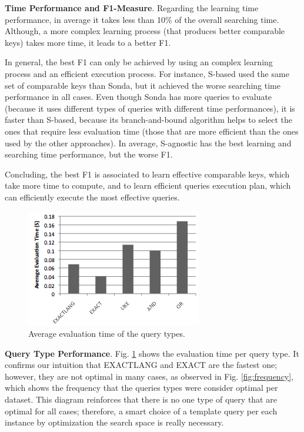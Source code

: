 \textbf{Time Performance and F1-Measure}. Regarding the learning time performance, in average it takes less than 10\% of the overall searching time. Although, a more complex learning process (that produces better comparable keys) takes more time, it leads to a better F1. 

In general, the best F1 can only be achieved by using an complex learning process and an efficient execution process. For instance, S-based used the same set of comparable keys than Sonda, but it achieved the worse searching time performance in all cases. Even though Sonda has more queries to evaluate (because it uses different types of queries with different time performances), it is faster than S-based, because its  branch-and-bound algorithm helps to select the ones that require less evaluation time (those that are more efficient than the ones used by the other approaches).  In average, S-agnostic has the best learning and searching time performance, but the worse F1. 

Concluding, the best F1 is associated to learn effective comparable keys, which take more time to compute, and to learn efficient queries execution plan, which can efficiently execute the most effective queries. 
  \begin{figure} [h]
\vspace{-10pt}
\centering
\includegraphics[scale=0.5]{p9.png}
\caption{Average evaluation time of the query types.} 
\vspace{-10pt}
\label{fig:time}
\end{figure} 
 
 \textbf{Query Type Performance}.  Fig. \ref{fig:time} shows the evaluation time per query type. It confirms our intuition that EXACTLANG and EXACT are the fastest one; however, they are not optimal in many cases, as observed in Fig. \ref{fig:frequency}, which shows the frequency that the queries types were consider optimal per dataset. This diagram reinforces that there is no one type of query that are optimal for all cases; therefore, a smart choice of a template query per each instance by optimization the search space is really necessary. 



